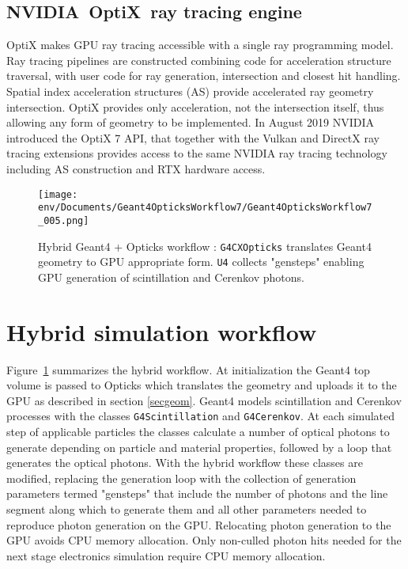 \documentclass{webofc}
\begin{document}
\subsection{NVIDIA\textregistered\ OptiX\texttrademark\ ray tracing engine}
%
OptiX makes GPU ray tracing accessible with a single ray programming model.
Ray tracing pipelines are constructed combining code for acceleration structure traversal, 
with user code for ray generation, intersection and closest hit handling.
Spatial index acceleration structures (AS) provide accelerated ray geometry intersection. 
OptiX provides only acceleration, not the intersection itself, thus allowing any form of geometry 
to be implemented. 
%
In August 2019 NVIDIA introduced the OptiX 7 API\cite{optix7},
that together with the Vulkan and DirectX ray tracing extensions provides access 
to the same NVIDIA ray tracing technology including AS construction and RTX hardware access. 
%
%
%
%
\begin{figure}[t]
\centering
\texttt{[image: env/Documents/Geant4OpticksWorkflow7/Geant4OpticksWorkflow7\_005.png]}
\caption{Hybrid Geant4 + Opticks workflow : {\tt G4CXOpticks} translates Geant4 geometry to GPU appropriate form. 
{\tt U4} collects "gensteps" enabling GPU generation of scintillation and Cerenkov photons.
}
\label{workflow} 
\vspace{-5mm}
\end{figure}
%
\section{Hybrid simulation workflow}%
\label{secworkflow}%
%
Figure~\ref{workflow} summarizes the hybrid workflow. 
At initialization the Geant4 top volume is passed to Opticks
which translates the geometry and uploads it to the GPU as described in section \ref{secgeom}.
%
Geant4 models scintillation and Cerenkov processes with the classes {\tt G4Scintillation} and {\tt G4Cerenkov}. 
At each simulated step of applicable particles the classes calculate a number of optical photons 
to generate depending on particle and material properties, followed by a loop that generates the optical photons. 
With the hybrid workflow these classes are modified, replacing the generation loop with the collection of 
generation parameters termed "gensteps" that include the number of photons and the line segment along which to generate them and all
other parameters needed to reproduce photon generation on the GPU. Relocating photon generation to the
GPU avoids CPU memory allocation. Only non-culled photon hits needed for the next stage electronics 
simulation require CPU memory allocation. 
\end{document}
